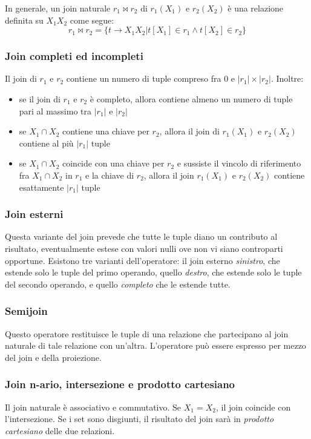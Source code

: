 \documentclass[11pt]{book}
\begin{document}
In generale, un join naturale $r_1\Join  r_2$ di $r_1(X_1)$ e $r_2(X_2)$ è una relazione definita su $X_1 X_2$ come segue:
\begin{equation*}
    r_1\Join r_2=\{t\rightarrow X_1X_2|t[X_1]\in r_1\wedge t[X_2]\in r_2\}
\end{equation*}
\subsubsection{Join completi ed incompleti}
Il join di $r_1$ e $r_2$ contiene un numero di tuple compreso fra 0 e $|r_1|\times|r_2|$. Inoltre:
\begin{itemize}
    \item se il join di $r_1$ e $r_2$ è completo, allora contiene almeno un numero di tuple pari al massimo tra $|r_1|$ 
    e $|r_2|$
    \item se $X_1\cap X_2$ contiene una chiave per $r_2$, allora il join di $r_1(X_1)$ e $r_2(X_2)$ contiene al più $|r_1|$
    tuple 
    \item se $X_1\cap X_2$ coincide con una chiave per $r_2$ e sussiste il vincolo di riferimento fra $X_1\cap X_2$ in 
    $r_1$ e la chiave di $r_2$, allora il join $r_1(X_1)$ e $r_2(X_2)$ contiene esattamente $|r_1|$ tuple
\end{itemize}
\subsubsection{Join esterni}
Questa variante del join prevede che tutte le tuple diano un contributo al risultato, eventualmente estese con valori 
nulli ove non vi siano controparti opportune. Esistono tre varianti dell'operatore: il join esterno \textit{sinistro}, 
che estende solo le tuple del primo operando, quello \textit{destro}, che estende solo le tuple del secondo operando, e 
quello \textit{completo} che le estende tutte.
\subsubsection{Semijoin}
Questo operatore restituisce le tuple di una relazione che partecipano al join naturale di tale relazione con un'altra.
L'operatore può essere espresso per mezzo del join e della proiezione.
\subsubsection{Join n-ario, intersezione e prodotto cartesiano}
Il join naturale è associativo e commutativo. Se $X_1=X_2$, il join coincide con l'intersezione. Se i set sono disgiunti, 
il risultato del join sarà in \textit{prodotto cartesiano} delle due relazioni.
\end{document}
